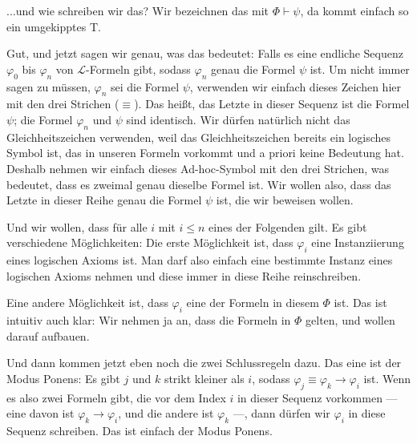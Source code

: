 \begin{spoken-clean}[00:19:15 - 00:21:34]
...und wie schreiben wir das? Wir bezeichnen das mit $\Phi \vdash \psi$, da kommt einfach so ein umgekipptes T. 

Gut, und jetzt sagen wir genau, was das bedeutet: Falls es eine endliche Sequenz $\varphi_0$ bis $\varphi_n$ von $\mathcal{L}$-Formeln gibt, sodass $\varphi_n$ genau die Formel $\psi$ ist. Um nicht immer sagen zu müssen, $\varphi_n$ sei die Formel $\psi$, verwenden wir einfach dieses Zeichen hier mit den drei Strichen ($\equiv$). Das heißt, das Letzte in dieser Sequenz ist die Formel $\psi$; die Formel $\varphi_n$ und $\psi$ sind identisch. Wir dürfen natürlich nicht das Gleichheitszeichen verwenden, weil das Gleichheitszeichen bereits ein logisches Symbol ist, das in unseren Formeln vorkommt und a priori keine Bedeutung hat. Deshalb nehmen wir einfach dieses Ad-hoc-Symbol mit den drei Strichen, was bedeutet, dass es zweimal genau dieselbe Formel ist. Wir wollen also, dass das Letzte in dieser Reihe genau die Formel $\psi$ ist, die wir beweisen wollen.
\end{spoken-clean}

\begin{spoken-clean}[00:21:34 - 00:23:48]
Und wir wollen, dass für alle $i$ mit $i \le n$ eines der Folgenden gilt. Es gibt verschiedene Möglichkeiten: Die erste Möglichkeit ist, dass $\varphi_i$ eine Instanziierung eines logischen Axioms ist. Man darf also einfach eine bestimmte Instanz eines logischen Axioms nehmen und diese immer in diese Reihe reinschreiben.

Eine andere Möglichkeit ist, dass $\varphi_i$ eine der Formeln in diesem $\Phi$ ist. Das ist intuitiv auch klar: Wir nehmen ja an, dass die Formeln in $\Phi$ gelten, und wollen darauf aufbauen.

Und dann kommen jetzt eben noch die zwei Schlussregeln dazu. Das eine ist der Modus Ponens: Es gibt $j$ und $k$ strikt kleiner als $i$, sodass $\varphi_j \equiv \varphi_k \to \varphi_i$ ist. Wenn es also zwei Formeln gibt, die vor dem Index $i$ in dieser Sequenz vorkommen --- eine davon ist $\varphi_k \to \varphi_i$, und die andere ist $\varphi_k$ ---, dann dürfen wir $\varphi_i$ in diese Sequenz schreiben. Das ist einfach der Modus Ponens.
\end{spoken-clean}

